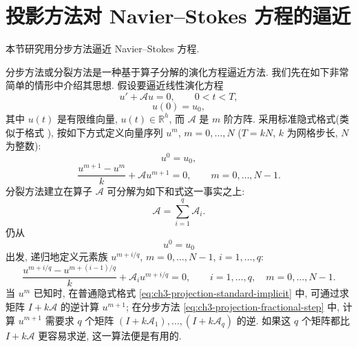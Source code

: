 \hypertarget{chapter-03-page-282}{}
\section{投影方法对 Navier--Stokes 方程的逼近}
\label{sec:ch3-projection-method}

本节研究用分步方法逼近 Navier--Stokes 方程.

分步方法或分裂方法是一种基于算子分解的演化方程逼近方法. 我们先在如下非常简单的情形中介绍其思想. 假设要逼近线性演化方程
\begin{equation}
u'+\mathcal Au=0,\qquad 0<t<T,
\label{eq:ch3-projection-linear-evolution}
\end{equation}
\begin{equation}
u(0)=u_0,
\label{eq:ch3-projection-linear-initial}
\end{equation}
其中 $u(t)$ 是有限维向量, $u(t)\in\mathbb R^h$, 而 $\mathcal A$ 是 $m$ 阶方阵. 采用标准隐式格式(类似于格式 ), 按如下方式定义向量序列 $u^m$, $m=0,\ldots,N$ ($T=kN$, $k$ 为网格步长, $N$ 为整数):
\begin{equation}
u^0=u_0,
\label{eq:ch3-projection-standard-initial}
\end{equation}
\begin{equation}
\frac{u^{m+1}-u^m}{k}+\mathcal Au^{m+1}=0,
\qquad m=0,\ldots,N-1.
\label{eq:ch3-projection-standard-implicit}
\end{equation}
分裂方法建立在算子 $\mathcal A$ 可分解为如下和式这一事实之上:
\begin{equation}
\mathcal A=\sum_{i=1}^q\mathcal A_i.
\label{eq:ch3-projection-operator-splitting}
\end{equation}
仍从
\begin{equation}
u^0=u_0
\label{eq:ch3-projection-split-initial}
\end{equation}
出发, 递归地定义元素族 $u^{m+i/q}$, $m=0,\ldots,N-1$, $i=1,\ldots,q$:
\begin{equation}
\frac{u^{m+i/q}-u^{m+(i-1)/q}}{k}
+\mathcal A_i u^{m+i/q}=0,
\qquad i=1,\ldots,q,\quad m=0,\ldots,N-1.
\label{eq:ch3-projection-fractional-step}
\end{equation}
当 $u^m$ 已知时, 在普通隐式格式 \eqref{eq:ch3-projection-standard-implicit} 中, 可通过求矩阵 $I+k\mathcal A$ 的逆计算 $u^{m+1}$; 在分步方法 \eqref{eq:ch3-projection-fractional-step} 中, 计算 $u^{m+1}$ 需要求 $q$ 个矩阵 $(I+k\mathcal A_1),\ldots,(I+k\mathcal A_q)$ 的逆. 如果这 $q$ 个矩阵都比 $I+k\mathcal A$ 更容易求逆, 这一算法便是有用的.

